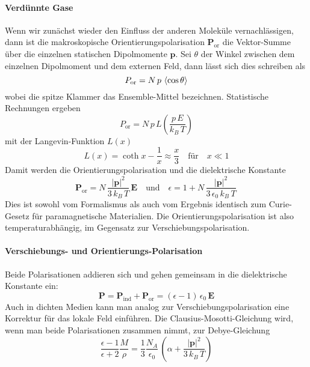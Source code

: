 \paragraph{Verdünnte Gase} Wenn wir zunächst wieder den Einfluss der anderen Moleküle vernachlässigen, dann ist die makroskopische Orientierungspolarisation $\mathbf{P}_\text{or}$ die Vektor-Summe über die einzelnen statischen Dipolmomente $ \mathbf{p}$. Sei $\theta$ der Winkel zwischen dem einzelnen Dipolmoment und dem externen Feld, dann lässt sich dies schreiben als
\begin{equation}
P_\text{or} = N \, p \, \braket{ \cos \theta}
\end{equation}
wobei die spitze Klammer das Ensemble-Mittel bezeichnen. Statistische Rechnungen ergeben
 \begin{equation}
P_\text{or} = N \, p \, L \left( \frac{p \, E}{k_B \, T} \right)
\end{equation}
mit der Langevin-Funktion $L(x)$
\begin{equation}
L(x) = \coth x - \frac{1}{x} \approx \frac{x}{3} \quad \text{für} \quad x \ll 1
\end{equation}
Damit werden die Orientierungspolarisation und die dielektrische Konstante
\begin{equation}
\mathbf{P}_\text{or} = N \, \frac{|\mathbf{p} |^2}{3 \, k_B \, T} \, \mathbf{E}  \quad \text{und} \quad \epsilon = 1 + N \, \frac{|\mathbf{p} |^2}{3\, \epsilon_0 \, k_B \, T} \,
\end{equation}
Dies ist sowohl vom Formalismus als auch vom Ergebnis identisch zum Curie-Gesetz für paramagnetische Materialien. Die Orientierungspolarisation ist also temperaturabhängig, im Gegensatz zur Verschiebungspolarisation.

\paragraph{Verschiebungs- und Orientierungs-Polarisation} Beide Polarisationen addieren sich und gehen gemeinsam in die dielektrische Konstante ein:
\begin{equation}
\mathbf{P}  = \mathbf{P}_\text{ind} + \mathbf{P}_\text{or} = \left( \epsilon - 1 \right) \, \epsilon_0 \, \mathbf{E}
\end{equation}
Auch in dichten Medien kann man analog zur Verschiebungspolarisation eine Korrektur für das lokale Feld einführen. Die Clausius-Mosotti-Gleichung wird, wenn man beide Polarisationen zusammen nimmt, zur Debye-Gleichung
 \begin{equation}
 \frac{\epsilon - 1}{\epsilon + 2} \frac{M}{\rho} = \frac{1}{3} \frac{N_A}{\epsilon
_0} \,  \left( \alpha  + \frac{|\mathbf{p} |^2}{3 \, k_B \, T}  \right)
 \end{equation}
 
